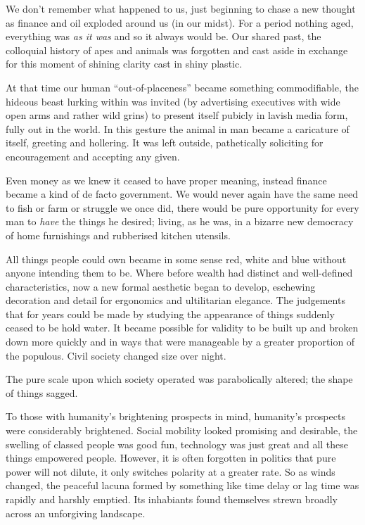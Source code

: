 \documentclass{book}
\begin{document}
We don't remember what happened to us, just beginning to chase a new thought as
finance and oil exploded around us (in our midst). For a period nothing aged,
everything was \emph{as it was} and so it always would be. Our shared past, the
colloquial history of apes and animals was forgotten and cast aside in exchange
for this moment of shining clarity cast in shiny plastic.

At that time our human ``out-of-placeness'' became something commodifiable, the
hideous beast lurking within was invited (by advertising executives with wide
open arms and rather wild grins) to present itself pubicly in lavish media
form, fully out in the world. In this gesture the animal in man became a
caricature of itself, greeting and hollering. It was left outside, pathetically
soliciting for encouragement and accepting any given.

Even money as we knew it ceased to have proper meaning, instead finance became
a kind of de facto government. We would never again have the same need to fish
or farm or struggle we once did, there would be pure opportunity for every man
to \emph{have} the things he desired; living, as he was, in a bizarre new
democracy of home furnishings and rubberised kitchen utensils.

All things people could own became in some sense red, white and blue without
anyone intending them to be. Where before wealth had distinct and well-defined
characteristics, now a new formal aesthetic began to develop, eschewing
decoration and detail for ergonomics and ultilitarian elegance. The judgements
that for years could be made by studying the appearance of things suddenly
ceased to be hold water.  It became possible for validity to be built up and
broken down more quickly and in ways that were manageable by a greater
proportion of the populous. Civil society changed size over night.

The pure scale upon which society operated was parabolically altered; the shape
of things sagged.

To those with humanity's brightening prospects in mind, humanity's prospects
were considerably brightened. Social mobility looked promising and desirable,
the swelling of classed people was good fun, technology was just great and all
these things empowered people. However, it is often forgotten in politics that
pure power will not dilute, it only switches polarity at a greater rate. So as
winds changed, the peaceful lacuna formed by something like time delay or lag
time was rapidly and harshly emptied. Its inhabiants found themselves strewn
broadly across an unforgiving landscape.
\end{document}
